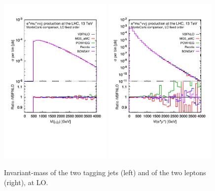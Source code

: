 \documentclass[a4paper,10pt]{report}
\begin{document}
\begin{figure}[h!]
   \centering
   \includegraphics[width=0.49\textwidth,angle=0,clip=true,trim={0.4cm 2.5cm 0.6cm 1.cm}]{figures/mjj_LO.pdf}
   \includegraphics[width=0.49\textwidth,angle=0,clip=true,trim={0.4cm 2.5cm 0.6cm 1.cm}]{figures/mll_LO.pdf}
\caption{\label{fig:mjj-llLO}Invariant-mass of the two tagging jets (left) and of the two leptons (right), at LO.
}
\end{figure}
%
\end{document}
